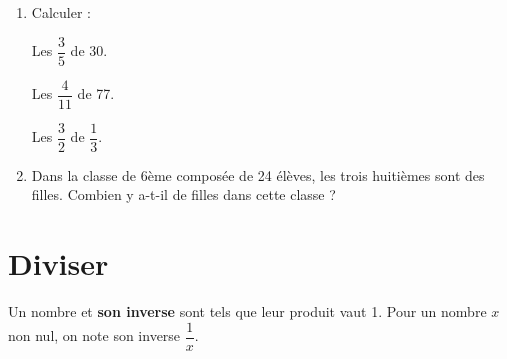 \documentclass[a4paper]{book}
\begin{document}
    \begin{exemple} 
        \begin{enumerate}
            \item Calculer :

            \begin{minipage}{0.3\linewidth}
                Les $\dfrac{3}{5}$ de 30.
    
                \vspace{2cm}
            \end{minipage}
            \hfill\vline\hfill
            \begin{minipage}{0.3\linewidth}
                Les $\dfrac{4}{11}$ de 77.
    
                \vspace{2cm}
            \end{minipage}
            \hfill\vline\hfill
            \begin{minipage}{0.3\linewidth}
                Les $\dfrac{3}{2}$ de $\dfrac{1}{3}$.
    
                \vspace{1.5cm}
            \end{minipage}       

            \item Dans la classe de 6ème composée de 24 élèves, les trois huitièmes sont des filles. Combien y a-t-il de filles dans cette classe ?

            \vspace{2cm}
        \end{enumerate}   
    \end{exemple}


\newpage

    
\section{Diviser}
    
    \begin{definition} 
        Un nombre et \textbf{son inverse} sont tels que leur produit vaut 1. Pour un nombre \( x \) non nul, on note son inverse \( \dfrac{1}{x} \).
    \end{definition}
    
\end{document}
